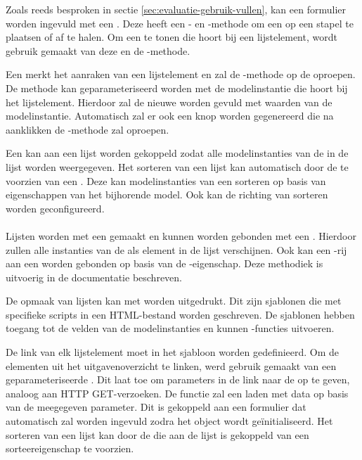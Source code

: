Zoals reeds besproken in sectie \ref{sec:evaluatie-gebruik-vullen}, kan een formulier worden ingevuld met een .
Deze  heeft een - en -methode om een  op een stapel te plaatsen of af te halen.
Om een  te tonen die hoort bij een lijstelement, wordt gebruik gemaakt van deze  en de -methode.

Een  merkt het aanraken van een lijstelement en zal de -methode op de  oproepen.
De methode kan geparameteriseerd worden met de modelinstantie die hoort bij het lijstelement.
Hierdoor zal de nieuwe  worden gevuld met waarden van de modelinstantie.
Automatisch zal er ook een  knop worden gegenereerd die na aanklikken de -methode zal oproepen.

Een  kan aan een lijst worden gekoppeld zodat alle modelinstanties van de  in de lijst worden weergegeven.
Het sorteren van een lijst kan automatisch door de  te voorzien van een .
Deze kan modelinstanties van een  sorteren op basis van eigenschappen van het bijhorende model.
Ook kan de richting van sorteren worden geconfigureerd.

\paragraph{\kendo}
Lijsten worden met een  gemaakt en kunnen worden gebonden met een .
Hierdoor zullen alle instanties van de  als element in de lijst verschijnen.
Ook kan een \js-rij aan een  worden gebonden op basis van de -eigenschap.
Deze methodiek is uitvoerig in de documentatie beschreven.

De opmaak van lijsten kan met  worden uitgedrukt.
Dit zijn sjablonen die met specifieke scripts in een HTML-bestand worden geschreven.
De sjablonen hebben toegang tot de velden van de modelinstanties en kunnen \js-functies uitvoeren.

De link van elk lijstelement moet in het sjabloon worden gedefinieerd.
Om de elementen uit het uitgavenoverzicht te linken, werd gebruik gemaakt van een geparameteriseerde .
Dit laat toe om parameters in de link naar de  op te geven,  analoog aan HTTP GET-verzoeken.
De functie zal een  laden met data op basis van de meegegeven parameter.
Dit  is gekoppeld aan een formulier dat automatisch zal worden ingevuld zodra het object wordt geïnitialiseerd.
Het sorteren van een lijst kan door de  die aan de lijst is gekoppeld van een sorteereigenschap te voorzien.

